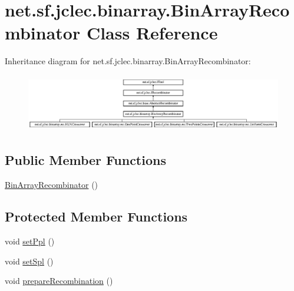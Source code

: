 \hypertarget{classnet_1_1sf_1_1jclec_1_1binarray_1_1_bin_array_recombinator}{\section{net.\-sf.\-jclec.\-binarray.\-Bin\-Array\-Recombinator Class Reference}
\label{classnet_1_1sf_1_1jclec_1_1binarray_1_1_bin_array_recombinator}
}
Inheritance diagram for net.\-sf.\-jclec.\-binarray.\-Bin\-Array\-Recombinator\-:\begin{figure}[H]
\begin{center}
\leavevmode
\includegraphics[height=2.527076cm]{classnet_1_1sf_1_1jclec_1_1binarray_1_1_bin_array_recombinator}
\end{center}
\end{figure}
\subsection*{Public Member Functions}
\begin{DoxyCompactItemize}
\item 
\hyperlink{classnet_1_1sf_1_1jclec_1_1binarray_1_1_bin_array_recombinator_a1234e043f0be3214049bef69e08678ea}{Bin\-Array\-Recombinator} ()
\end{DoxyCompactItemize}
\subsection*{Protected Member Functions}
\begin{DoxyCompactItemize}
\item 
void \hyperlink{classnet_1_1sf_1_1jclec_1_1binarray_1_1_bin_array_recombinator_a8ecb2813d8dca18e20c7673d94efc315}{set\-Ppl} ()
\item 
void \hyperlink{classnet_1_1sf_1_1jclec_1_1binarray_1_1_bin_array_recombinator_a39e8897cd7cd2e4f8ba312432405c7c7}{set\-Spl} ()
\item 
void \hyperlink{classnet_1_1sf_1_1jclec_1_1binarray_1_1_bin_array_recombinator_adfb02ddf2e1aa3a0f3d59229f3b4334b}{prepare\-Recombination} ()
\end{DoxyCompactItemize}
